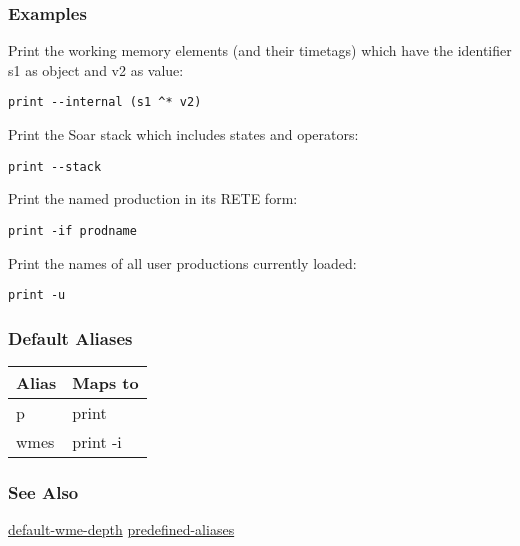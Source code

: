 \subsubsection*{Examples}
 Print the working memory elements (and their timetags) which have the identifier s1 as object and v2 as value: \begin{verbatim}
print --internal (s1 ^* v2)
\end{verbatim}
 Print the Soar stack which includes states and operators: \begin{verbatim}
print --stack
\end{verbatim}
 Print the named production in its RETE form: \begin{verbatim}
print -if prodname
\end{verbatim}
 Print the names of all user productions currently loaded: \begin{verbatim}
print -u
\end{verbatim}
\subsubsection*{Default Aliases}
\begin{tabular}{|l|l|}
\hline 
 Alias  & Maps to  \\
 \hline 
 p  & print  \\
 \hline 
 wmes  & print -i  \\
 \hline 
\end{tabular}
\subsubsection*{See Also}
\hyperref[default-wme-depth]{default-wme-depth} \hyperref[predefined-aliases]{predefined-aliases} 